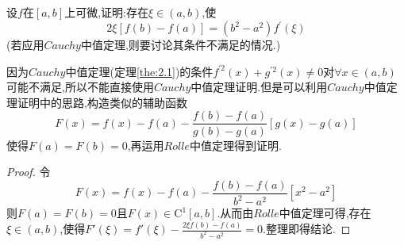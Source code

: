 \documentclass[lang=cn,newtx,10pt,scheme=chinese]{../Template/elegantbook}
\begin{document}
\begin{exercise}
设\(f\)在\([a,b]\)上可微,证明:存在\(\xi\in(a,b)\),使
\begin{equation}
2\xi[f(b)-f(a)]=(b^{2}-a^{2})f^{\prime}(\xi)
    \nonumber
\end{equation}
(若应用$Cauchy$中值定理,则要讨论其条件不满足的情况.)
\begin{note}
    因为$Cauchy$中值定理(定理\ref{the:2.1})的条件$f^{\prime2}(x)+g^{\prime2}(x)\neq0$对$\forall x\in(a,b)$可能不满足,所以不能直接使用$Cauchy$中值定理证明.但是可以利用$Cauchy$中值定理证明中的思路,构造类似的辅助函数
    \begin{equation}
    F(x)=f(x)-f(a)-\frac{f(b)-f(a)}{g\left( b \right) -g\left( a \right)}\left[ g\left( x \right) -g\left( a \right) \right] 
        \nonumber
    \end{equation}
    使得$F(a)=F(b)=0$,再运用$Rolle$中值定理得到证明.
\end{note}
\begin{proof}
    令
    \begin{equation}
    F(x)=f(x)-f(a)-\frac{f(b)-f(a)}{b^2-a^2}\left[ x^2-a^2 \right]
        \nonumber
    \end{equation}
    则$F(a)=F(b)=0$且$F(x)\in\mathrm{C}^1[a,b]$.从而由$Rolle$中值定理可得,存在$\xi\in(a,b)$,使得$F'(\xi )=f'(\xi )-\frac{2\xi f(b)-f(a)}{b^2-a^2}=0$.整理即得结论.

\end{proof}
\end{exercise}
\end{document}
